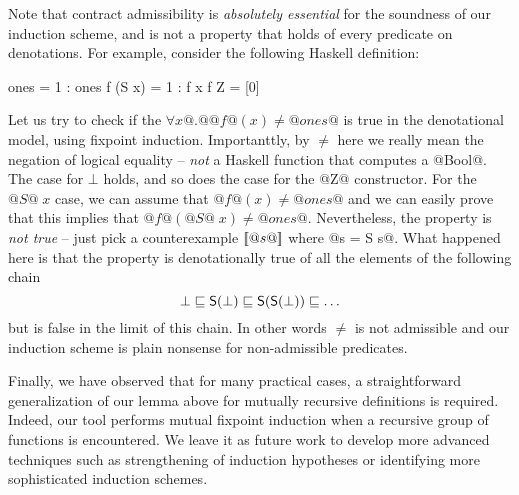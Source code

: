 Note that contract admissibility is {\em absolutely essential} for the
soundness of our induction scheme, and is not a property that holds of
every predicate on denotations. For example, consider the following
Haskell definition:
\begin{code}
  ones = 1 : ones
  f (S x) = 1 : f x
  f Z     = [0]
\end{code}
Let us try to check if the $\forall x @.@ @f@(x) \neq @ones@$ is true in 
the denotational model, using fixpoint induction. Importanttly, by $\neq$ here we 
really mean the negation of logical equality -- {\em not} a Haskell
function that computes a @Bool@. The case for $\bot$ holds, 
and so does the case for the @Z@ constructor. For the $@S@\;x$ case, we can 
assume that $@f@(x) \neq @ones@$ and we can easily prove that this implies that
$@f@(@S@\;x) \neq @ones@$. Nevertheless, the property is {\em not true} -- just pick 
a counterexample $[\![@s@]\!]$ where @s = S s@. What happened here is that the property 
is denotationally true of all the elements of the following chain
\[ \bot \sqsubseteq \mathsf{S}(\bot) \sqsubseteq \mathsf{S}(\mathsf{S}(\bot)) \sqsubseteq \ldots \] 
but is false in the limit of this chain. In other words $\neq$ is not admissible and our 
induction scheme is plain nonsense for non-admissible predicates. 

Finally, we have observed that for many practical cases, a
straightforward generalization of our lemma above for mutually
recursive definitions is required. Indeed, our tool performs mutual
fixpoint induction when a recursive group of functions is
encountered. We leave it as future work to develop more advanced
techniques such as strengthening of induction hypotheses or
identifying more sophisticated induction schemes.


